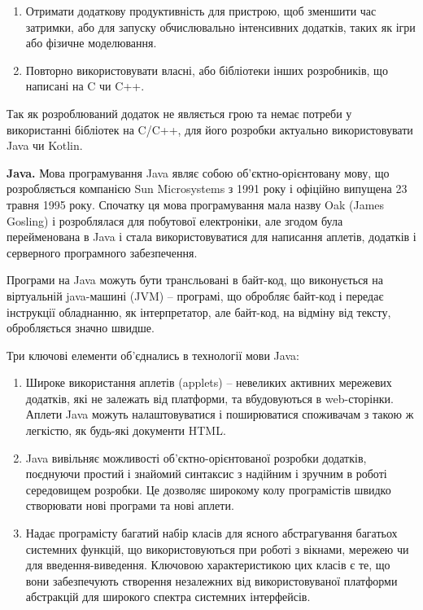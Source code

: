 \documentclass[../main.tex]{subfiles}
\begin{document}
\begin{enumerate}
	\item Отримати додаткову продуктивність для пристрою, щоб зменшити час затримки, або для запуску обчислювально інтенсивних додатків, таких як ігри або фізичне моделювання.
	\item Повторно використовувати власні, або бібліотеки інших розробників, що написані на C чи C++.
\end{enumerate}

Так як розроблюваний додаток не являється грою та немає потреби у використанні бібліотек на C/C++, для його розробки актуально використовувати Java чи Kotlin.

\textbf{Java.}
Мова програмування Java являє собою об'єктно-орієнтовану мову, що розробляється компанією Sun Microsystems з 1991 року і офіційно випущена 23 травня 1995 року. Спочатку ця мова програмування  мала назву Oak (James Gosling) і розроблялася для побутової електроніки, але згодом була перейменована в Java і стала використовуватися для написання аплетів, додатків і серверного програмного забезпечення.

Програми на Java можуть бути трансльовані в байт-код, що виконується на віртуальній java-машині (JVM) -- програмі, що обробляє байт-код і передає інструкції обладнанню, як інтерпретатор, але байт-код, на відміну від тексту, обробляється значно швидше.

Три ключові елементи об'єднались в технології мови Java:
\begin{enumerate}
	\item Широке використання аплетів (applets) -- невеликих активних мережевих додатків, які не залежать від платформи, та вбудовуються в web-сторінки. Аплети Java можуть налаштовуватися і поширюватися споживачам з такою ж легкістю, як будь-які документи HTML.
	\item Java вивільняє можливості об'єктно-орієнтованої розробки додатків, поєднуючи простий і знайомий синтаксис з надійним і зручним в роботі середовищем розробки. Це дозволяє широкому колу програмістів швидко створювати нові програми та нові аплети.
	\item Надає програмісту багатий набір класів для ясного абстрагування багатьох системних функцій, що використовуються при роботі з вікнами, мережею чи для введення-виведення. Ключовою характеристикою цих класів є те, що вони забезпечують створення незалежних від використовуваної платформи абстракцій для широкого спектра системних інтерфейсів.
\end{enumerate}
\end{document}
